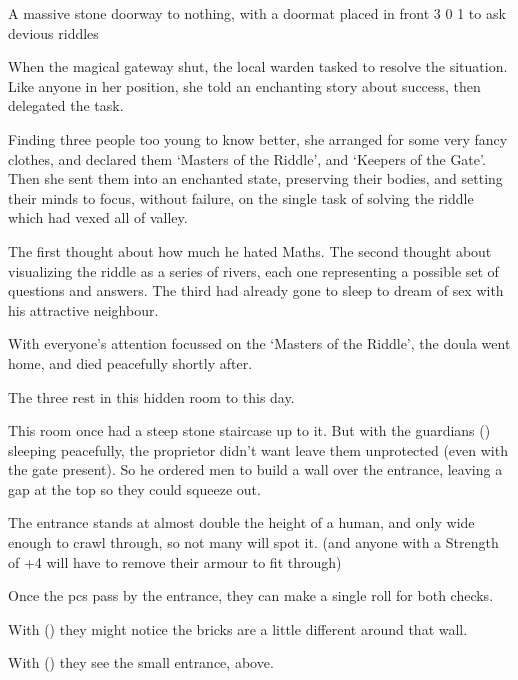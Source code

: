   {A massive stone doorway to nothing, with a doormat placed in front}%
  {3}%
  {0}%
  {1}%
  {to ask devious riddles}%
  {
    \setcounter{Fire}{3}
    \setcounter{Earth}{2}
    \setcounter{Fate}{1}
    \setcounter{Water}{1}
    \setcounter{Academics}{2}
    \setcounter{Wyldcrafting}{1}
  }%

\showStdSpells[
  \setcounter{diceNo}{0}
]


\begin{exampletext}
  When the magical gateway shut, the local \gls{warden} tasked  to resolve the situation.
  Like anyone in her position, she told an enchanting story about success, then delegated the task.

  Finding three people too young to know better, she arranged for some very fancy clothes, and declared them `Masters of the Riddle', and `Keepers of the Gate'.
  Then she sent them into an enchanted state, preserving their bodies, and setting their minds to focus, without failure, on the single task of solving the riddle which had vexed all of \gls{valley}.

  The first thought about how much he hated Maths.
  The second thought about visualizing the riddle as a series of rivers, each one representing a possible set of questions and answers.
  The third had already gone to sleep to dream of sex with his attractive neighbour.

  With everyone's attention focussed on the `Masters of the Riddle', the \gls{doula} went home, and died peacefully shortly after.

  The three rest in this hidden room to this day.
\end{exampletext}


\begin{exampletext}
  This room once had a steep stone staircase up to it.
  But with the guardians () sleeping peacefully, the proprietor didn't want leave them unprotected (even with the gate present).
  So he ordered men to build a wall over the entrance, leaving a gap at the top so they could squeeze out.
\end{exampletext}

The entrance stands at almost double the height of a human, and only wide enough to crawl through, so not many will spot it.
(and anyone with a Strength of +4 will have to remove their armour to fit through)

Once the \glspl{pc} pass by the entrance, they can make a single roll for both checks.

With  (\tn[14]) they might notice the bricks are a little different around that wall.

With  (\tn[12]) they see the small entrance, above.

